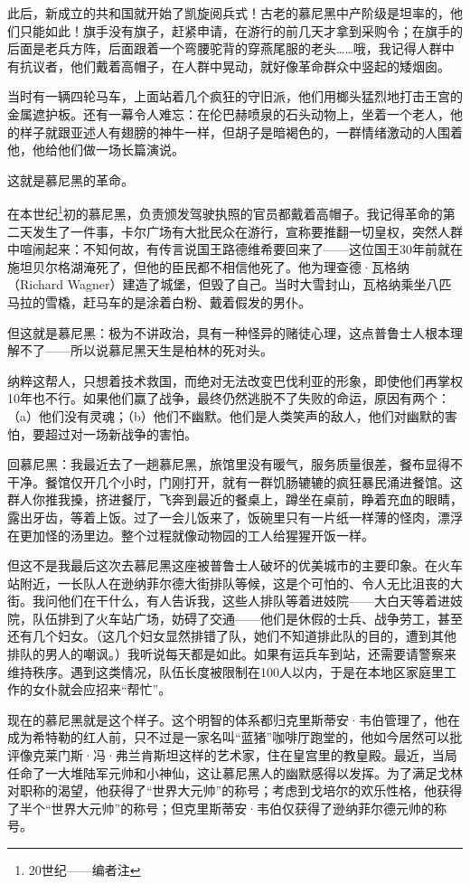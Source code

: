 \documentclass[UTF8]{ctexart}
\begin{document}
此后，新成立的共和国就开始了凯旋阅兵式！古老的慕尼黑中产阶级是坦率的，他们只能如此！旗手没有旗子，赶紧申请，在游行的前几天才拿到采购令；在旗手的后面是老兵方阵，后面跟着一个弯腰驼背的穿燕尾服的老头……哦，我记得人群中有抗议者，他们戴着高帽子，在人群中晃动，就好像革命群众中竖起的矮烟囱。

当时有一辆四轮马车，上面站着几个疯狂的守旧派，他们用榔头猛烈地打击王宫的金属遮护板。还有一幕令人难忘：在伦巴赫喷泉的石头动物上，坐着一个老人，他的样子就跟亚述人有翅膀的神牛一样，但胡子是暗褐色的，一群情绪激动的人围着他，他给他们做一场长篇演说。

这就是慕尼黑的革命。

在本世纪\footnote{20世纪——编者注}初的慕尼黑，负责颁发驾驶执照的官员都戴着高帽子。我记得革命的第二天发生了一件事，卡尔广场有大批民众在游行，宣称要推翻一切皇权，突然人群中喧闹起来：不知何故，有传言说国王路德维希要回来了——这位国王30年前就在施坦贝尔格湖淹死了，但他的臣民都不相信他死了。他为理查德·瓦格纳（Richard Wagner）建造了城堡，但毁了自己。当时大雪封山，瓦格纳乘坐八匹马拉的雪橇，赶马车的是涂着白粉、戴着假发的男仆。

但这就是慕尼黑：极为不讲政治，具有一种怪异的赌徒心理，这点普鲁士人根本理解不了——所以说慕尼黑天生是柏林的死对头。

纳粹这帮人，只想着技术救国，而绝对无法改变巴伐利亚的形象，即使他们再掌权10年也不行。如果他们赢了战争，最终仍然逃脱不了失败的命运，原因有两个：（a）他们没有灵魂；（b）他们不幽默。他们是人类笑声的敌人，他们对幽默的害怕，要超过对一场新战争的害怕。

回慕尼黑：我最近去了一趟慕尼黑，旅馆里没有暖气，服务质量很差，餐布显得不干净。餐馆仅开几个小时，门刚打开，就有一群饥肠辘辘的疯狂暴民涌进餐馆。这群人你推我搡，挤进餐厅，飞奔到最近的餐桌上，蹲坐在桌前，睁着充血的眼睛，露出牙齿，等着上饭。过了一会儿饭来了，饭碗里只有一片纸一样薄的怪肉，漂浮在更加怪的汤里边。整个过程就像动物园的工人给猩猩开饭一样。

但这不是我最后这次去慕尼黑这座被普鲁士人破坏的优美城市的主要印象。在火车站附近，一长队人在逊纳菲尔德大街排队等候，这是个可怕的、令人无比沮丧的大街。我问他们在干什么，有人告诉我，这些人排队等着进妓院——大白天等着进妓院，队伍排到了火车站广场，妨碍了交通——他们是休假的士兵、战争劳工，甚至还有几个妇女。（这几个妇女显然排错了队，她们不知道排此队的目的，遭到其他排队的男人的嘲讽。）我听说每天都是如此。如果有运兵车到站，还需要请警察来维持秩序。遇到这类情况，队伍长度被限制在100人以内，于是在本地区家庭里工作的女仆就会应招来“帮忙”。

现在的慕尼黑就是这个样子。这个明智的体系都归克里斯蒂安·韦伯管理了，他在成为希特勒的红人前，只不过是一家名叫“蓝猪”咖啡厅跑堂的，他如今居然可以批评像克莱门斯·冯·弗兰肯斯坦这样的艺术家，住在皇宫里的教皇殿。最近，当局任命了一大堆陆军元帅和小神仙，这让慕尼黑人的幽默感得以发挥。为了满足戈林对职称的渴望，他获得了“世界大元帅”的称号；考虑到戈培尔的欢乐性格，他获得了半个“世界大元帅”的称号；但克里斯蒂安·韦伯仅获得了逊纳菲尔德元帅的称号。
\end{document}
